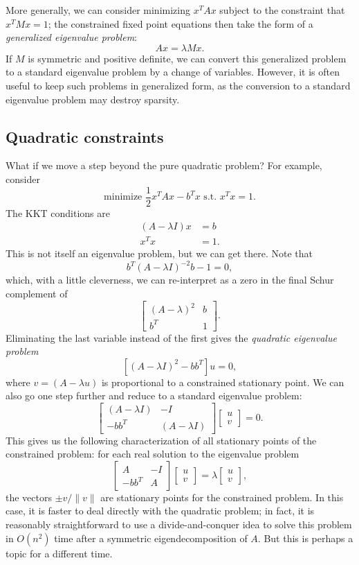 \documentclass[12pt, leqno]{article} %
\begin{document}
More generally, we can consider minimizing $x^T A x$ subject
to the constraint that $x^T M x = 1$; the constrained fixed point
equations then take the form of a {\em generalized eigenvalue problem}:
\[
  Ax = \lambda M x.
\]
If $M$ is symmetric and positive definite, we can convert this
generalized problem to a standard eigenvalue problem by a change of
variables.  However, it is often useful to keep such problems in
generalized form, as the conversion to a standard eigenvalue problem
may destroy sparsity.

\subsection*{Quadratic constraints}

What if we move a step beyond the pure quadratic problem?
For example, consider
\[
  \mbox{minimize } \frac{1}{2} x^T A x - b^T x \mbox{ s.t.~} x^T x = 1.
\]
The KKT conditions are
\begin{align*}
  (A-\lambda I) x &= b \\
  x^T x &= 1.
\end{align*}
This is not itself an eigenvalue problem, but we can get there.
Note that
\[
  b^T (A-\lambda I)^{-2} b-1 = 0,
\]
which, with a little cleverness, we can re-interpret as a zero
in the final Schur complement of
\[
  \begin{bmatrix}
  (A-\lambda)^2 & b \\
  b^T & 1
  \end{bmatrix}.
\]
Eliminating the last variable instead of the first gives the
{\em quadratic eigenvalue problem}
\[
  \left[ (A-\lambda I)^2 - b b^T \right] u = 0,
\]
where $v = (A-\lambda u)$ is proportional to a constrained stationary
point.  We can also go one step further and reduce to a standard
eigenvalue problem:
\[
\begin{bmatrix}
  (A-\lambda I) & -I \\
  -bb^T & (A-\lambda I)
\end{bmatrix}
\begin{bmatrix}
  u \\ v
\end{bmatrix} = 0.
\]
This gives us the following characterization of all stationary points
of the constrained problem: for each real solution to the eigenvalue
problem
\[
\begin{bmatrix}
  A & -I \\
  -bb^T & A
\end{bmatrix}
\begin{bmatrix}
  u \\ v
\end{bmatrix} =
\lambda
\begin{bmatrix}
  u \\ v
\end{bmatrix},
\]
the vectors $\pm v/\|v\|$ are stationary points for the constrained
problem.  In this case, it is faster to deal directly with
the quadratic problem; in fact, it is reasonably straightforward to
use a divide-and-conquer idea to solve this problem in $O(n^2)$ time
after a symmetric eigendecomposition of $A$.  But this is perhaps
a topic for a different time.
\end{document}

